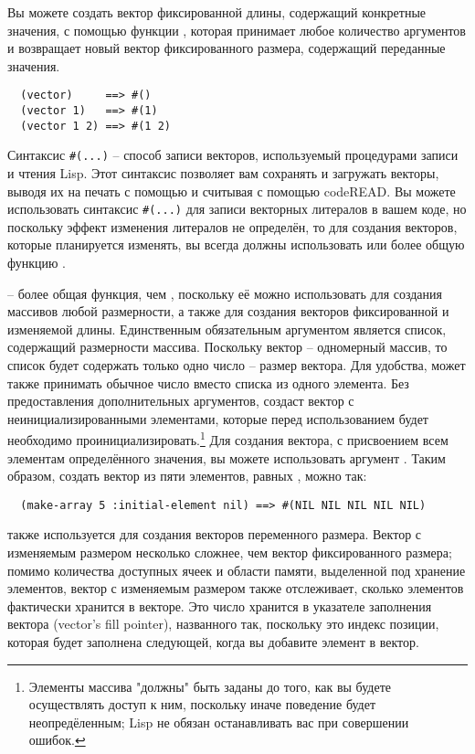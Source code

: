 Вы можете создать вектор фиксированной длины, содержащий конкретные значения, с помощью
функции , которая принимает любое количество аргументов и возвращает
новый вектор фиксированного размера, содержащий переданные значения.

\begin{verbatim}
  (vector)     ==> #()
  (vector 1)   ==> #(1)
  (vector 1 2) ==> #(1 2)
\end{verbatim}

Синтаксис \lstinline!#(...)! -- способ записи векторов, используемый процедурами
записи и чтения Lisp.  Этот синтаксис позволяет вам сохранять и загружать векторы,
выводя их на печать с помощью  и считывая с помощью code{READ}.
Вы можете использовать синтаксис \lstinline!#(...)! для
записи векторных литералов в вашем коде, но поскольку эффект изменения литералов не определён,
то для создания векторов, которые планируется изменять, вы всегда должны 
использовать  или более общую функцию .

 -- более общая функция, чем , поскольку её можно
использовать для создания массивов любой размерности, а также для создания векторов
фиксированной и изменяемой длины. Единственным обязательным аргументом 
является список, содержащий размерности массива.  Поскольку вектор -- одномерный массив,
то список будет содержать только одно число -- размер вектора.  Для удобства,
 может также принимать обычное число вместо списка из одного элемента.
Без предоставления дополнительных аргументов,  создаст вектор с
неинициализированными элементами, которые перед использованием будет необходимо
проинициализировать.\footnote{Элементы массива "должны" быть заданы до того, как вы будете осуществлять
  доступ к ним, поскольку иначе поведение будет неопредёленным; Lisp не обязан
  останавливать вас при совершении ошибок.}  Для создания вектора, с присвоением всем
элементам определённого значения, вы можете использовать аргумент .
Таким образом, создать вектор из пяти элементов, равных , можно так:

\begin{verbatim}
  (make-array 5 :initial-element nil) ==> #(NIL NIL NIL NIL NIL)
\end{verbatim}

 также используется для создания векторов переменного размера.
Вектор с изменяемым размером несколько сложнее, чем вектор фиксированного размера;
помимо количества доступных ячеек и области памяти, выделенной под хранение элементов,
вектор с изменяемым размером также отслеживает, сколько элементов фактически
хранится в векторе.  Это число хранится в указателе заполнения вектора (vector's fill
pointer), названного так, поскольку это индекс позиции, которая будет заполнена следующей,
когда вы добавите элемент в вектор.

